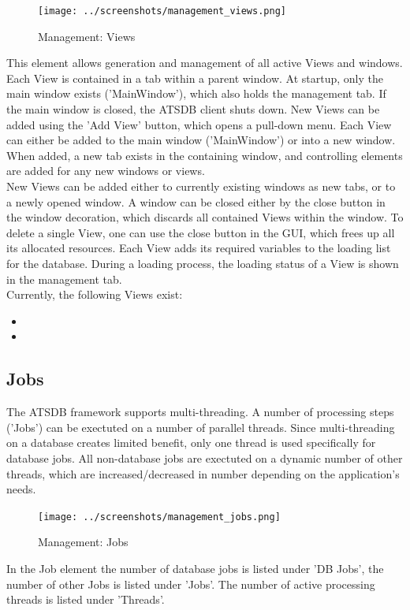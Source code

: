 \begin{figure}[H]
  \center
    \texttt{[image: ../screenshots/management\_views.png]}
  \caption{Management: Views}
\end{figure}

This element allows generation and management of all active Views and windows. Each View is contained
in a tab within a parent window.  At startup, only the main window exists ('MainWindow'), which also holds
the management tab. If the main window is closed, the ATSDB client shuts down. New Views can be added using the 'Add View' button, which opens a pull-down menu. Each View can either be added to the main window ('MainWindow') or into a new window. When added, a new tab exists in the containing window, and controlling elements are added for any new
windows or views. \\

New Views can be added either to currently existing windows as new tabs, or to a newly opened window. A window can be closed either by the close button in the window decoration, which discards all contained Views within the window.  To delete a single View, one can use the close button in the GUI, which frees up all its allocated resources. Each View adds its required variables to the loading list for the database.  During a loading process, the loading status  of a View is shown in the management tab.\\

Currently, the following Views exist:
\begin{itemize}
 \item {}
 \item {}
\end{itemize}


\subsection{Jobs}

The ATSDB framework supports multi-threading. A number of processing steps ('Jobs') can be exectuted on a number of parallel threads. Since multi-threading on a database creates limited benefit, only one thread is used specifically for database jobs. All non-database jobs are exectuted on a dynamic number of other threads, which are increased/decreased in number depending on the application's needs. 

\begin{figure}[H]
  \center
    \texttt{[image: ../screenshots/management\_jobs.png]}
  \caption{Management: Jobs}
\end{figure}

In the Job element the number of database jobs is listed under 'DB Jobs', the number of other Jobs is listed under 'Jobs'. The number of active processing threads is listed under 'Threads'.
 
